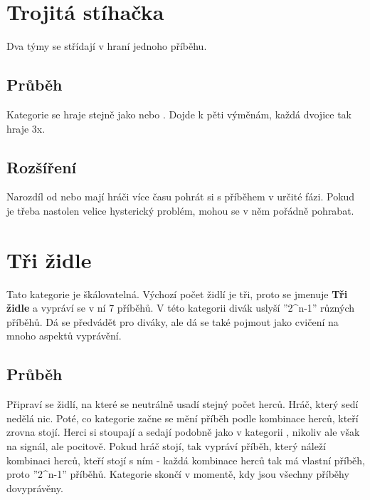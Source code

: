  
 
 
\needspace{5cm} \section{Trojitá stíhačka} \label{trojitá stíhačka}  
Dva týmy se střídají v hraní jednoho příběhu. 
 
\subsection{ Průběh } Kategorie se hraje stejně jako  nebo . Dojde k pěti výměnám, každá dvojice tak hraje 3x. 
 
\subsection{ Rozšíření } Narozdíl od  nebo  mají hráči více času pohrát si s příběhem v určité fázi. Pokud je třeba nastolen velice hysterický problém, mohou se v něm pořádně pohrabat. 
 
 
 
 
\needspace{5cm} \section{Tři židle} \label{tři židle}  
 
Tato kategorie je škálovatelná. Výchozí počet židlí je tři, proto se jmenuje \textbf{Tři židle}{} a vypráví se v ní 7 příběhů. V této kategorii divák uslyší ''2\^{}n-1'' různých příběhů.  Dá se předvádět pro diváky, ale dá se také pojmout jako cvičení na mnoho aspektů vyprávění. 
 
\subsection{Průběh}  
Připraví se  židlí, na které se neutrálně usadí stejný počet herců. Hráč, který sedí nedělá nic. Poté, co kategorie začne se mění příběh podle kombinace herců, kteří zrovna stojí. Herci si stoupají a sedají podobně jako v kategorii , nikoliv ale však na signál, ale pocitově. Pokud hráč stojí, tak vypráví příběh, který náleží kombinaci herců, kteří stojí s ním - každá kombinace herců tak má vlastní příběh, proto ''2\^{}n-1'' příběhů. Kategorie skončí v momentě, kdy jsou všechny příběhy dovyprávěny. 
 
